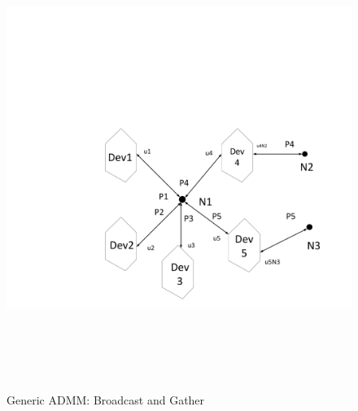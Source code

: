 \documentclass[preprint,12pt,3p]{elsarticle}
\begin{document}
	\begin{figure}
		\begin{center}
			\vspace*{-2cm}
			\hspace*{-4cm}
			\includegraphics[height=15cm,width=20cm]{Prox.pdf}
			\caption{Generic ADMM: Broadcast and Gather}
			\label{ADMMGen}
		\end{center}
	\end{figure}
\end{document}
